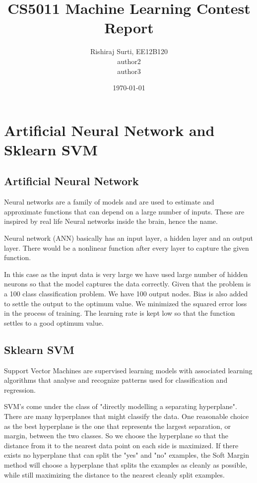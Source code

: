 \documentclass[a4paper]{article}
\title{CS5011 Machine Learning Contest Report}
\author{Rishiraj Surti, EE12B120\\
	author2\\
	author3\\}
\date{\today}
\begin{document}
\maketitle

\section{Artificial Neural Network and Sklearn SVM}

\subsection{Artificial Neural Network}

Neural networks are a family of models and are used to estimate and approximate functions that can depend on a large number of inputs. These are inspired by real life Neural networks inside the brain, hence the name.

Neural network (ANN) basically has an input layer, a hidden layer and an output layer. There would be a nonlinear function after every layer to capture the given function.

In this case as the input data is very large we have used large number of hidden neurons so that the model captures the data correctly. Given that the problem is a 100 class classification problem. We have 100 output nodes. Bias is also added to settle the output to the optimum value. We minimized the squared error loss in the process of training. The learning rate is kept low so that the function settles to a good optimum value.

\subsection{Sklearn SVM}

Support Vector Machines are supervised learning models with associated learning algorithms that analyse and recognize patterns used for classification and regression.

SVM's come under the class of "directly modelling a separating hyperplane".
There are many hyperplanes that might classify the data. One reasonable choice as the best hyperplane is the one that represents the largest separation, or margin, between the two classes. So we choose the hyperplane so that the distance from it to the nearest data point on each side is maximized. If there exists no hyperplane that can split the "yes" and "no" examples, the Soft Margin method will choose a hyperplane that splits the examples as cleanly as possible, while still maximizing the distance to the nearest cleanly split examples.
\end{document}
